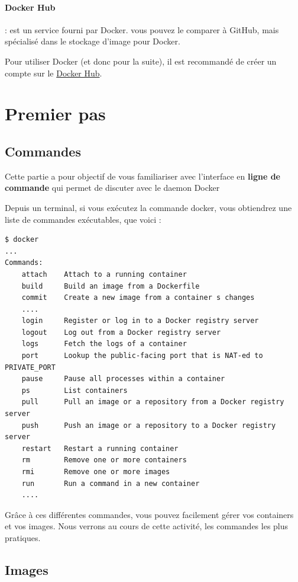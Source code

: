 \documentclass[french, 12pt]{article}%
\begin{document}
\paragraph{Docker Hub } : est un service fourni par Docker. vous pouvez le comparer à GitHub, mais spécialisé dans le stockage d'image pour Docker.

Pour utiliser Docker (et donc pour la suite), il est recommandé de créer un compte sur le \href{https://hub.docker.com/}{Docker Hub}. 

\section{Premier pas}

\subsection{Commandes}
Cette partie a pour objectif de vous familiariser avec l'interface en \textbf{ligne de commande} qui permet de discuter avec le daemon Docker 


Depuis un terminal, si vous exécutez la commande docker, vous obtiendrez une liste de commandes exécutables, que voici :


\begin{lstlisting}
$ docker
...
Commands:
    attach    Attach to a running container
    build     Build an image from a Dockerfile
    commit    Create a new image from a container s changes
	....
    login     Register or log in to a Docker registry server
    logout    Log out from a Docker registry server
    logs      Fetch the logs of a container
    port      Lookup the public-facing port that is NAT-ed to PRIVATE_PORT
    pause     Pause all processes within a container
    ps        List containers
    pull      Pull an image or a repository from a Docker registry server
    push      Push an image or a repository to a Docker registry server
    restart   Restart a running container
    rm        Remove one or more containers
    rmi       Remove one or more images
    run       Run a command in a new container
    ....
\end{lstlisting}

Grâce à ces différentes commandes, vous pouvez facilement gérer vos containers et vos images.  Nous verrons au cours de cette activité, les commandes les plus pratiques.


\subsection{Images}
\end{document}
